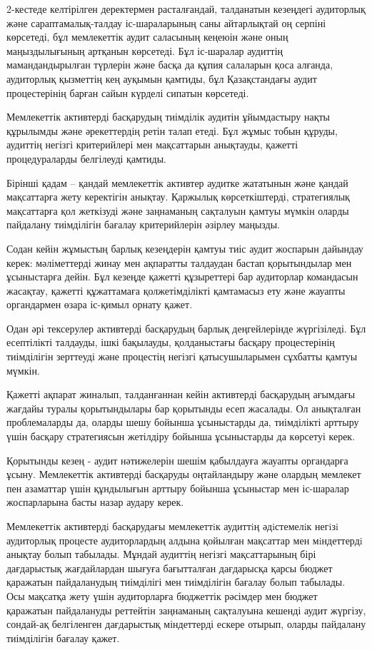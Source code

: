 2-кестеде келтірілген деректермен расталғандай, талданатын кезеңдегі
аудиторлық және сараптамалық-талдау іс-шараларының саны айтарлықтай оң
серпіні көрсетеді, бұл мемлекеттік аудит саласының кеңеюін және оның
маңыздылығының артқанын көрсетеді. Бұл іс-шаралар аудиттің
мамандандырылған түрлерін және басқа да құпия салаларын қоса алғанда,
аудиторлық қызметтің кең ауқымын қамтиды, бұл Қазақстандағы аудит
процестерінің барған сайын күрделі сипатын көрсетеді.

Мемлекеттік активтерді басқарудың тиімділік аудитін ұйымдастыру нақты
құрылымды және әрекеттердің ретін талап етеді. Бұл жұмыс тобын құруды,
аудиттің негізгі критерийлері мен мақсаттарын анықтауды, қажетті
процедураларды белгілеуді қамтиды.

Бірінші қадам -- қандай мемлекеттік активтер аудитке жататынын және
қандай мақсаттарға жету керектігін анықтау. Қаржылық көрсеткіштерді,
стратегиялық мақсаттарға қол жеткізуді және заңнаманың сақталуын қамтуы
мүмкін оларды пайдалану тиімділігін бағалау критерийлерін әзірлеу
маңызды.

Содан кейін жұмыстың барлық кезеңдерін қамтуы тиіс аудит жоспарын
дайындау керек: мәліметтерді жинау мен ақпаратты талдаудан бастап
қорытындылар мен ұсыныстарға дейін. Бұл кезеңде қажетті құзыреттері бар
аудиторлар командасын жасақтау, қажетті құжаттамаға қолжетімділікті
қамтамасыз ету және жауапты органдармен өзара іс-қимыл орнату қажет.

Одан әрі тексерулер активтерді басқарудың барлық деңгейлерінде
жүргізіледі. Бұл есептілікті талдауды, ішкі бақылауды, қолданыстағы
басқару процестерінің тиімділігін зерттеуді және процестің негізгі
қатысушыларымен сұхбатты қамтуы мүмкін.

Қажетті ақпарат жиналып, талданғаннан кейін активтерді басқарудың
ағымдағы жағдайы туралы қорытындылары бар қорытынды есеп жасалады. Ол
анықталған проблемаларды да, оларды шешу бойынша ұсыныстарды да,
тиімділікті арттыру үшін басқару стратегиясын жетілдіру бойынша
ұсыныстарды да көрсетуі керек.

Қорытынды кезең - аудит нәтижелерін шешім қабылдауға жауапты органдарға
ұсыну. Мемлекеттік активтерді басқаруды оңтайландыру және олардың
мемлекет пен азаматтар үшін құндылығын арттыру бойынша ұсыныстар мен
іс-шаралар жоспарларына басты назар аудару керек.

Мемлекеттiк активтердi басқарудағы мемлекеттiк аудиттiң әдiстемелiк
негiзi аудиторлық процесте аудиторлардың алдына қойылған мақсаттар мен
мiндеттердi анықтау болып табылады. Мұндай аудиттің негізгі
мақсаттарының бірі дағдарыстық жағдайлардан шығуға бағытталған
дағдарысқа қарсы бюджет қаражатын пайдаланудың тиімділігі мен
тиімділігін бағалау болып табылады. Осы мақсатқа жету үшін аудиторларға
бюджеттік рәсімдер мен бюджет қаражатын пайдалануды реттейтін заңнаманың
сақталуына кешенді аудит жүргізу, сондай-ақ белгіленген дағдарыстық
міндеттерді ескере отырып, оларды пайдалану тиімділігін бағалау қажет.

